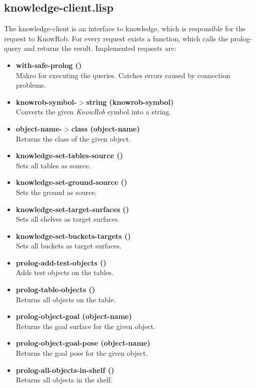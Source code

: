 \documentclass[main.tex]{subfiles}
\begin{document}
		\subsection{knowledge-client.lisp}
		The knowledge-client is an interface to knowledge, which is responsible for the request to KnowRob. For every request exists a function, which calls the prolog-query and returns the result. Implemented requests are:
			\begin{itemize}
			\label{knowledge-client}
			  \item \textbf{with-safe-prolog ()} \\
			  Makro for executing the queries. Catches errors caused by connection problems.
			  \item \textbf{knowrob-symbol-$>$string (knowrob-symbol)} \\
			  Converts the given \textit{KnowRob} symbol into a string.
			  \item \textbf{object-name-$>$class (object-name)} \\
			  Returns the class of the given object.
				\item \textbf{knowledge-set-tables-source ()} \\ Sets all tables as source.
				\item \textbf{knowledge-set-ground-source ()} \\ Sets the ground as source.
				\item \textbf{knowledge-set-target-surfaces ()} \\ Sets all shelves as target surfaces.
				\item \textbf{knowledge-set-buckets-targets ()} \\ Sets all buckets as target surfaces.
			  \item \textbf{prolog-add-test-objects ()} \\ Adds test objects on the tables.
				\item \textbf{prolog-table-objects ()} \\ Returns all objects on the table.
				\item \textbf{prolog-object-goal (object-name)} \\ Returns the goal surface for the given object.
			  \item \textbf{prolog-object-goal-pose (object-name)} \\ Returns the goal pose for the given object.
				\item \textbf{prolog-all-objects-in-shelf ()} \\ Returns all objects in the shelf.

\end{itemize}
\end{document}

